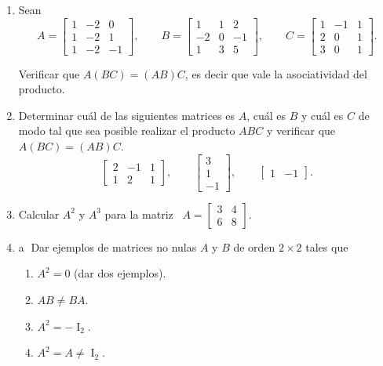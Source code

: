 \begin{enumerate}[topsep=6pt,itemsep=.4cm]


\item\label{ej} Sean
$$
A= \begin{bmatrix} 1&-2&0\\ 1&-2&1\\ 1&-2&-1\end{bmatrix},\quad
\quad B= \begin{bmatrix}1&1&2\\ -2&0&-1\\ 1&3&5 \end{bmatrix},
\quad\quad C=\begin{bmatrix}1&-1&1\\ 2&0&1\\ 3&0&1 \end{bmatrix}.
$$

Verificar que $A(BC)=(AB)C$, es decir que vale la asociatividad del producto.


\item\label{ej2} Determinar cuál de las siguientes matrices es $A$, cuál es $B$ y cuál es $C$ de modo tal que sea posible realizar el producto $ABC$ y verificar que $A(BC)=(AB)C$.
\begin{equation*}
\begin{bmatrix} 2 & -1 & 1 \\ 1 & 2 &
1\end{bmatrix},\qquad
\begin{bmatrix} 3 \\ 1 \\ -1\end{bmatrix}, \qquad
\begin{bmatrix} 1 & -1 \end{bmatrix}.
\end{equation*}


\item Calcular $A^2$ y $A^3$ para la matriz \
$
A=\begin{bmatrix}
3 & 4\\ 6 & 8
\end{bmatrix}.
$


\item\label{ejemplos 2x2} \textcircled{a} Dar ejemplos de matrices no nulas $A$ y $B$ de orden $2\times2$ tales que
\begin{multicols}{2}
\begin{enumerate}[topsep=5pt,itemsep=5pt]
 \item $A^2=0$ (dar dos ejemplos).
 \item $AB\neq BA$.
 \item $A^2=-\operatorname{I}_2$.
 \item $A^2=A\neq\operatorname{I}_2$.
\end{enumerate}
\end{multicols}



\end{enumerate}
